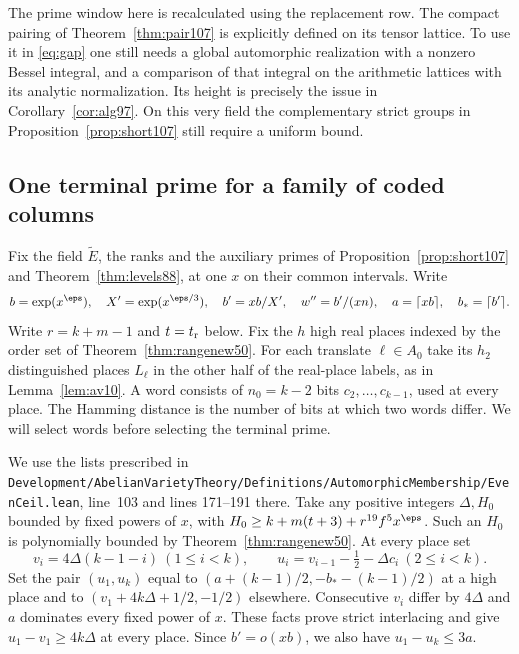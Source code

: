 \documentclass[a4paper,11pt]{article}
\theoremstyle{definition}
\theoremstyle{remark}
\newcommand{\srcloc}[2]{{\small\nolinkurl{#1.lean}}, line~#2}
\numberwithin{equation}{section}
\begin{document}
The prime window here is recalculated using the replacement row.
The compact pairing of Theorem~\ref{thm:pair107} is explicitly
defined on its tensor lattice. To use it in \eqref{eq:gap} one
still needs a global automorphic realization with a nonzero
Bessel integral, and a comparison of that integral on the
arithmetic lattices with its analytic normalization. Its
height is precisely the issue in Corollary~\ref{cor:alg97}.
On this very field the complementary strict groups in
Proposition~\ref{prop:short107} still require a uniform bound.

\subsection{One terminal prime for a family of coded columns}\label{nav:VI-26}
Fix the field \(\widetilde E\), the ranks and the auxiliary primes
of Proposition~\ref{prop:short107} and Theorem~\ref{thm:levels88},
at one \(x\) on their common intervals. Write
\[
 b=\exp(x^\eps),\quad X'=\exp(x^{\eps/3}),\quad
 b'=xb/X',\quad w''=b'/(xn),\quad a=\lceil xb\rceil,\quad
 b_*=\lceil b'\rceil .
\]
Write \(r=k+m-1\) and \(t=t_{\rm r}\) below. Fix the \(h\) high
real places indexed by the order set of Theorem~\ref{thm:rangenew50}.
For each translate \(\ell\in A_0\) take its \(h_2\) distinguished
places \(L_\ell\) in the other half of the real-place labels, as
in Lemma~\ref{lem:av10}. A word consists of
\(n_0=k-2\) bits \(c_2,\ldots,c_{k-1}\), used at every place.
The Hamming distance is the number of bits at which two words
differ. We will select words before selecting the terminal prime.

We use the lists prescribed in
\srcloc{Development/AbelianVarietyTheory/Definitions/AutomorphicMembership/EvenCeil}{103}
and lines 171--191 there. Take any positive integers \(\Delta,H_0\)
bounded by fixed powers of \(x\), with
\(H_0\ge k+m(t+3)+r^{19}f^5x^\eps\). Such an \(H_0\) is
polynomially bounded by Theorem~\ref{thm:rangenew50}. At every place set
\begin{equation}
 v_i=4\Delta(k-1-i)\ (1\le i<k),\qquad
 u_i=v_{i-1}-\tfrac12-\Delta c_i\ (2\le i<k).
                                                               \label{eq:letters111}
\end{equation}
Set the pair \((u_1,u_k)\) equal to
\((a+(k-1)/2,-b_*-(k-1)/2)\) at a high place and to
\((v_1+4k\Delta+1/2,-1/2)\) elsewhere. Consecutive \(v_i\)
differ by \(4\Delta\) and \(a\) dominates every fixed power of
\(x\). These facts prove strict interlacing and give
\(u_1-v_1\ge4k\Delta\) at every place. Since \(b'=o(xb)\),
we also have \(u_1-u_k\le3a\).
\end{document}

